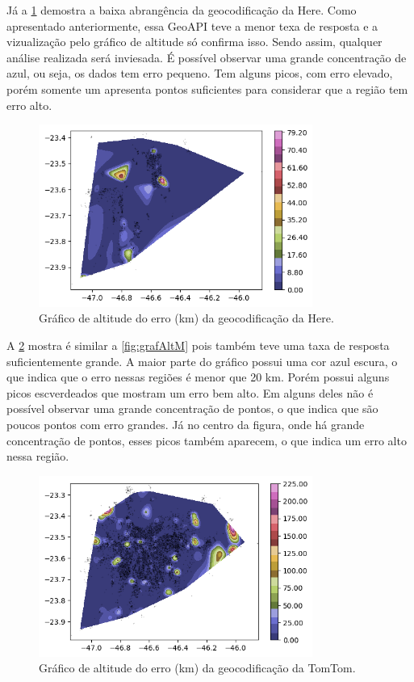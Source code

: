 Já a \ref{fig:grafAltH} demostra a baixa abrangência da geocodificação da Here. Como apresentado anteriormente, essa GeoAPI teve a menor texa de resposta e a vizualização pelo gráfico de altitude só confirma isso. Sendo assim, qualquer análise realizada será inviesada. É possível observar uma grande concentração de azul, ou seja, os dados tem erro pequeno. Tem alguns picos, com erro elevado, porém somente um apresenta pontos suficientes para considerar que a região tem erro alto. 

\begin{figure}[h]
  \centering
  \includegraphics[width=0.8\textwidth]{Figuras/graficoAltPontosHere.png}
  \caption{Gráfico de altitude do erro (km) da geocodificação da Here.}
  \label{fig:grafAltH}
\end{figure}

A \ref{fig:grafAltT} mostra é similar a \ref{fig:grafAltM} pois também teve uma taxa de resposta suficientemente grande. A maior parte do gráfico possui uma cor azul escura, o que indica que o erro nessas regiões é menor que 20 km. Porém possui alguns picos escverdeados que mostram um erro bem alto. Em alguns deles não é possível observar uma grande concentração de pontos, o que indica que são poucos pontos com erro grandes. Já no centro da figura, onde há grande concentração de pontos, esses picos também aparecem, o que indica um erro alto nessa região.
\begin{figure}[h]
  \centering
  \includegraphics[width=0.8\textwidth]{Figuras/graficoAltPontosTomtom.png}
  \caption{Gráfico de altitude do erro (km) da geocodificação da TomTom.}
  \label{fig:grafAltT}
\end{figure}


